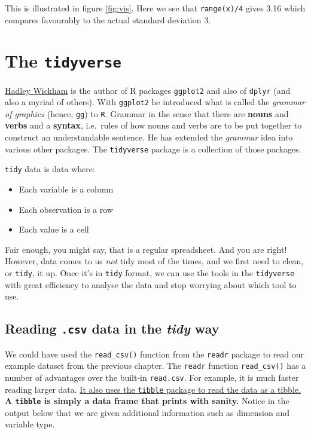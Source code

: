 \documentclass[]{book}
\providecommand{\tightlist}{%
  \setlength{\itemsep}{0pt}\setlength{\parskip}{0pt}}
\begin{document}
This is illustrated in figure \ref{fig:vis}. Here we see that \texttt{range(x)/4} gives 3.16 which compares favourably to the actual standard deviation 3.

\hypertarget{the-tidyverse}{%
\section{\texorpdfstring{The \texttt{tidyverse}}{The tidyverse}}\label{the-tidyverse}}

\href{http://hadley.nz}{Hadley Wickham} is the author of R packages \texttt{ggplot2} and also of \texttt{dplyr} (and also a myriad of others). With \texttt{ggplot2} he introduced what is called the \emph{grammar of graphics} (hence, \texttt{gg}) to \texttt{R}. Grammar in the sense that there are \textbf{nouns} and \textbf{verbs} and a \textbf{syntax}, i.e.~rules of how nouns and verbs are to be put together to construct an understandable sentence. He has extended the \emph{grammar} idea into various other packages. The \texttt{tidyverse} package is a collection of those packages.

\texttt{tidy} data is data where:

\begin{itemize}
\tightlist
\item
  Each variable is a column
\item
  Each observation is a row
\item
  Each value is a cell
\end{itemize}

Fair enough, you might say, that is a regular spreadsheet. And you are right! However, data comes to us \emph{not} tidy most of the times, and we first need to clean, or \texttt{tidy}, it up. Once it's in \texttt{tidy} format, we can use the tools in the \texttt{tidyverse} with great efficiency to analyse the data and stop worrying about which tool to use.

\hypertarget{reading-.csv-data-in-the-tidy-way}{%
\subsection{\texorpdfstring{Reading \texttt{.csv} data in the \emph{tidy} way}{Reading .csv data in the tidy way}}\label{reading-.csv-data-in-the-tidy-way}}

We could have used the \texttt{read\_csv()} function from the \texttt{readr} package to read our example dataset from the previous chapter. The \texttt{readr} function \texttt{read\_csv()} has a number of advantages over the built-in \texttt{read.csv}. For example, it is much faster reading larger data. \href{https://cran.r-project.org/web/packages/tibble/vignettes/tibble.html}{It also uses the \texttt{tibble} package to read the data as a tibble.} \textbf{A \texttt{tibble} is simply a data frame that prints with sanity.} Notice in the output below that we are given additional information such as dimension and variable type.
\end{document}
